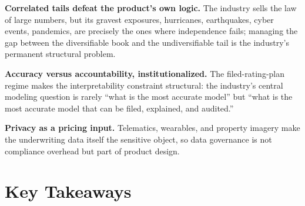 \documentclass[../ai_in_finance]{subfiles}
\begin{document}
\textbf{Correlated tails defeat the product's own logic.} The industry sells the law of large numbers, but its gravest exposures, hurricanes, earthquakes, cyber events, pandemics, are precisely the ones where independence fails; managing the gap between the diversifiable book and the undiversifiable tail is the industry's permanent structural problem.

\textbf{Accuracy versus accountability, institutionalized.} The filed-rating-plan regime makes the interpretability constraint structural: the industry's central modeling question is rarely ``what is the most accurate model'' but ``what is the most accurate model that can be filed, explained, and audited.''

\textbf{Privacy as a pricing input.} Telematics, wearables, and property imagery make the underwriting data itself the sensitive object, so data governance is not compliance overhead but part of product design.

\section{Key Takeaways}
\end{document}
